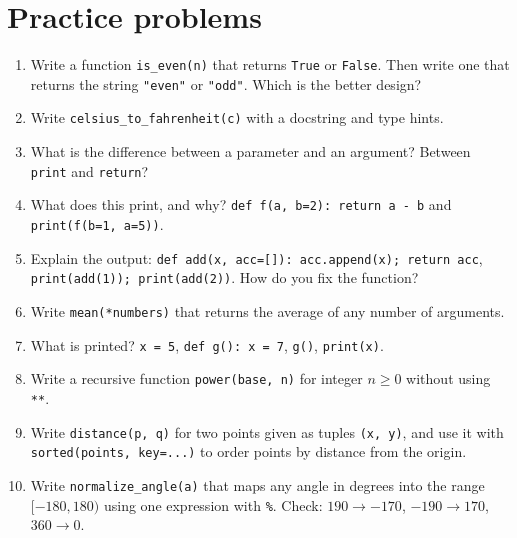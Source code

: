 \section*{Practice problems}
\begin{enumerate}[label=\textbf{\thechapter.\arabic*}]
  \item Write a function \texttt{is\_even(n)} that returns \texttt{True} or \texttt{False}. Then write one that returns the string \texttt{"even"} or \texttt{"odd"}. Which is the better design?
  \item Write \texttt{celsius\_to\_fahrenheit(c)} with a docstring and type hints.
  \item What is the difference between a parameter and an argument? Between \texttt{print} and \texttt{return}?
  \item What does this print, and why? \verb!def f(a, b=2): return a - b! and \verb!print(f(b=1, a=5))!.
  \item Explain the output: \verb!def add(x, acc=[]): acc.append(x); return acc!, \verb!print(add(1)); print(add(2))!. How do you fix the function?
  \item Write \texttt{mean(*numbers)} that returns the average of any number of arguments.
  \item What is printed? \verb!x = 5!, \verb!def g(): x = 7!, \verb!g()!, \verb!print(x)!.
  \item Write a recursive function \texttt{power(base, n)} for integer $n\geq0$ without using \verb!**!.
  \item Write \texttt{distance(p, q)} for two points given as tuples \texttt{(x, y)}, and use it with \texttt{sorted(points, key=...)} to order points by distance from the origin.
  \item[\textbf{\thechapter.10}$\star$] Write \texttt{normalize\_angle(a)} that maps any angle in degrees into the range $[-180,180)$ using one expression with \texttt{\%}. Check: $190\to-170$, $-190\to170$, $360\to0$.
\end{enumerate}

